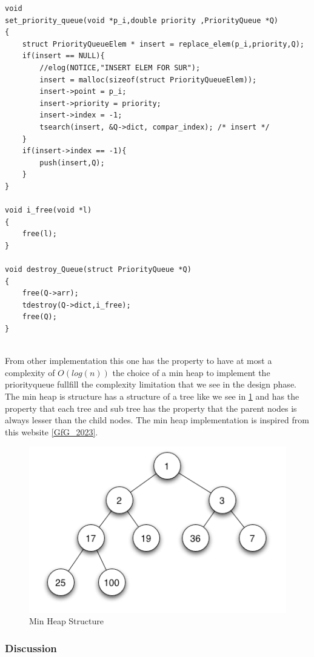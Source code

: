\documentclass[twoside,12pt, a4paper]{report}
\begin{document}
\begin{lstlisting}
void
set_priority_queue(void *p_i,double priority ,PriorityQueue *Q)
{
	struct PriorityQueueElem * insert = replace_elem(p_i,priority,Q);
	if(insert == NULL){
		//elog(NOTICE,"INSERT ELEM FOR SUR");
		insert = malloc(sizeof(struct PriorityQueueElem));
		insert->point = p_i;
		insert->priority = priority;
		insert->index = -1;
		tsearch(insert, &Q->dict, compar_index); /* insert */
	}
	if(insert->index == -1){
		push(insert,Q);
	}
}

void i_free(void *l)
{
	free(l);
}

void destroy_Queue(struct PriorityQueue *Q)
{
	free(Q->arr);
	tdestroy(Q->dict,i_free);
	free(Q);
}
	
\end{lstlisting}

From other implementation this one has the property to have at most a complexity of $O(log(n))$ the choice of a min heap to implement the priorityqueue fullfill the complexity limitation that we see in the design phase. The min heap is structure has a structure of a tree like we see in \ref{fig:min_heap} and has the property that each tree and sub tree has the property that the parent nodes is always lesser than the child nodes. The min heap implementation is inspired from this website \ref{GfG_2023}.



\begin{figure}[!h]
	\centering
	\includegraphics[width=1\linewidth]{figures/tree.png}
	\caption{Min Heap Structure}
	\label{fig:min_heap}
\end{figure}


\subsubsection{Discussion}
\end{document}
